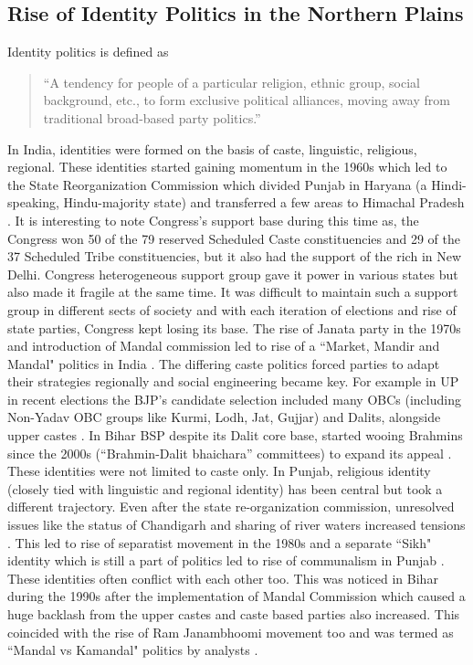 \begin{sloppypar}
\subsection{Rise of Identity Politics in the Northern Plains}
Identity politics is defined as \begin{quote}
     ``A tendency for people of a particular religion, ethnic group, social background, etc., to form exclusive political alliances, moving away from traditional broad-based party politics.''
 \end{quote}  \citep{oed2024}
In India, identities were formed on the basis of caste, linguistic, religious, regional. These identities started gaining momentum in the 1960s which led to the State Reorganization Commission which divided Punjab in Haryana (a Hindi-speaking, Hindu-majority state) and transferred a few areas to Himachal Pradesh \citep{Punjab_1966_reorg}. It is interesting to note Congress's support base during this time as, the Congress won 50 of the 79 reserved Scheduled Caste constituencies and 29 of the 37 Scheduled Tribe constituencies, but it also had the support of the rich in New Delhi. Congress heterogeneous support group gave it power in various states but also made it fragile at the same time. It was difficult to maintain such a support group in different sects of society and with each iteration of elections and rise of state parties, Congress kept losing its base. The rise of Janata party in the 1970s and introduction of Mandal commission led to rise of a ``Market, Mandir and Mandal" politics in India \citep{yadav1999electoral}. The differing caste politics forced parties to adapt their strategies regionally and social engineering became key. For example in UP in recent elections the BJP’s candidate selection  included many OBCs (including Non-Yadav OBC groups like Kurmi, Lodh, Jat, Gujjar) and Dalits, alongside upper castes \citep{jaffrelot2012castes}. In Bihar BSP despite its Dalit core base, started wooing Brahmins since the 2000s (“Brahmin-Dalit bhaichara” committees) to expand its appeal \citep{ankit2018caste}. These identities were not limited to caste only. In Punjab, religious identity (closely tied with linguistic and regional identity) has been central but took a different trajectory. Even after the state re-organization commission,  unresolved issues like the status of Chandigarh and sharing of river waters increased tensions \citep{padhiari2008inter}. This led to rise of separatist movement in the 1980s and a separate ``Sikh" identity which is still a part of politics led to rise of communalism in Punjab \citep{gupta1985communalising}. These identities often conflict with each other too. This was noticed in Bihar during the 1990s after the implementation of Mandal Commission which caused a huge backlash from the upper castes and caste based parties also increased. This coincided with the rise of Ram Janambhoomi movement too and was termed as ``Mandal vs Kamandal" politics by analysts \citep{roy2024politics}. 


\end{sloppypar}
